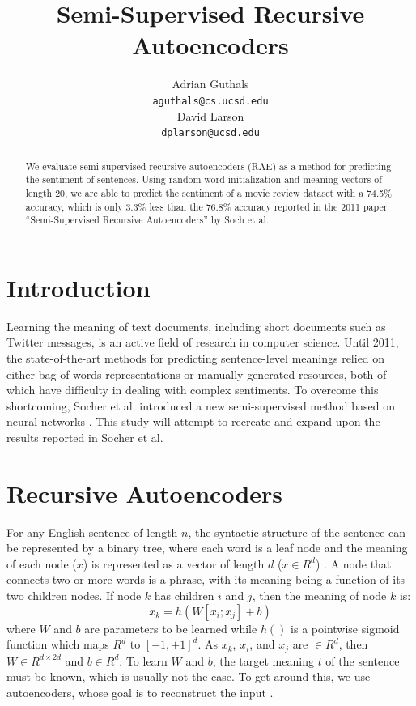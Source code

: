 \documentclass{article}
\title{Semi-Supervised Recursive Autoencoders}
\author{
Adrian Guthals \\
\texttt{aguthals@cs.ucsd.edu} \\
\And
David Larson \\
\texttt{dplarson@ucsd.edu} \\
}
\begin{document}
\maketitle


\begin{abstract}
We evaluate semi-supervised recursive autoencoders (RAE) as a method for predicting the sentiment of sentences. Using random word initialization and meaning vectors of length 20, we are able to predict the sentiment of a movie review dataset with a 74.5\% accuracy, which is only 3.3\% less than the 76.8\% accuracy reported in the 2011 paper ``Semi-Supervised Recursive Autoencoders'' by Soch et al.
\end{abstract}



\section{Introduction}
Learning the meaning of text documents, including short documents such as Twitter messages, is an active field of research in computer science. Until 2011, the state-of-the-art methods for predicting sentence-level meanings relied on either bag-of-words representations or manually generated resources, both of which have difficulty in dealing with complex sentiments. To overcome this shortcoming, Socher et al. introduced a new semi-supervised method based on neural networks \cite{Socher}. This study will attempt to recreate and expand upon the results reported in Socher et al.




\section{Recursive Autoencoders}
For any English sentence of length $n$, the syntactic structure of the sentence can be represented by a binary tree, where each word is a leaf node and the meaning of each node ($x$) is represented as a vector of length $d$ ($x \in R^d$) \cite{CSE250B}. A node that connects two or more words is a phrase, with its meaning being a function of its two children nodes. If node $k$ has children $i$ and $j$, then the meaning of node $k$ is:
\begin{equation}
    x_k = h(W[x_i ; x_j] + b)
    \label{eq:xk}
\end{equation}
where $W$ and $b$ are parameters to be learned while $h()$ is a pointwise sigmoid function which maps $R^d$ to $[-1, +1]^d$. As $x_k$, $x_i$, and $x_j$ are $\in R^d$, then $W \in R^{d \times 2d}$ and $b \in R^d$. To learn $W$ and $b$, the target meaning $t$ of the sentence must be known, which is usually not the case. To get around this, we use autoencoders, whose goal is to reconstruct the input \cite{CSE250B}.
\end{document}
